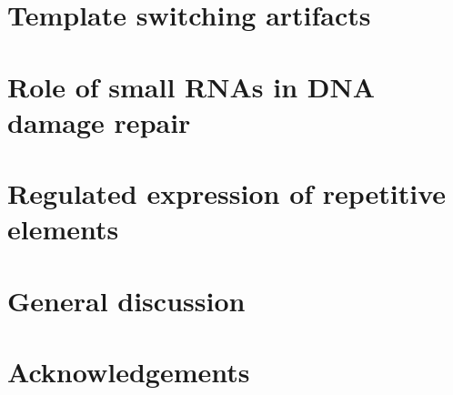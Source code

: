 \documentclass[10pt,a4paper]{report}
\begin{document}
\chapter{Template switching artifacts}\label{template_switching}




\chapter{Role of small RNAs in DNA damage repair}\label{ddrna}



%
%

%
%

\chapter{Regulated expression of repetitive elements}\label{repeat}


%

\chapter{General discussion}\label{discussion}


\chapter*{Acknowledgements}




\end{document}
